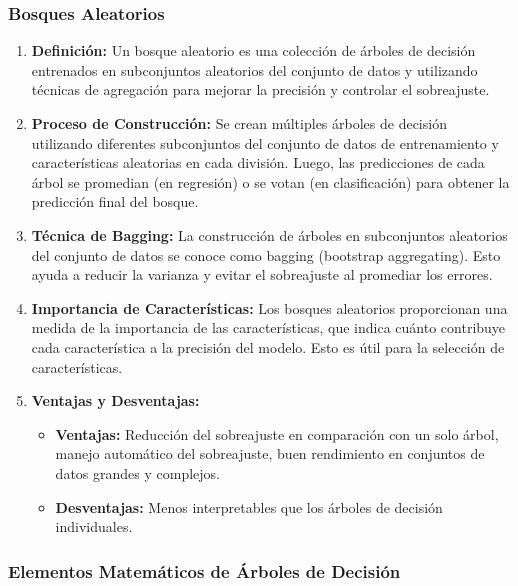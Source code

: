 \documentclass[12pt]{article}
\begin{document}
\subsubsection{Bosques Aleatorios}

\begin{enumerate}
    \item \textbf{Definición:}
        Un bosque aleatorio es una colección de árboles de decisión entrenados en subconjuntos aleatorios del conjunto de datos y utilizando técnicas de agregación para mejorar la precisión y controlar el sobreajuste.

    \item \textbf{Proceso de Construcción:}
        Se crean múltiples árboles de decisión utilizando diferentes subconjuntos del conjunto de datos de entrenamiento y características aleatorias en cada división. Luego, las predicciones de cada árbol se promedian (en regresión) o se votan (en clasificación) para obtener la predicción final del bosque.

    \item \textbf{Técnica de Bagging:}
        La construcción de árboles en subconjuntos aleatorios del conjunto de datos se conoce como bagging (bootstrap aggregating). Esto ayuda a reducir la varianza y evitar el sobreajuste al promediar los errores.

    \item \textbf{Importancia de Características:}
        Los bosques aleatorios proporcionan una medida de la importancia de las características, que indica cuánto contribuye cada característica a la precisión del modelo. Esto es útil para la selección de características.

    \item \textbf{Ventajas y Desventajas:}
        \begin{itemize}
            \item \textbf{Ventajas:} Reducción del sobreajuste en comparación con un solo árbol, manejo automático del sobreajuste, buen rendimiento en conjuntos de datos grandes y complejos.
            \item \textbf{Desventajas:} Menos interpretables que los árboles de decisión individuales.
        \end{itemize}
\end{enumerate}

\subsubsection{Elementos Matemáticos de Árboles de Decisión}
\end{document}
